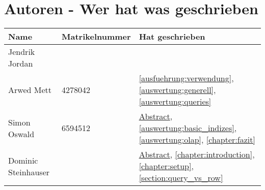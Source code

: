 \chapter{Autoren - Wer hat was geschrieben}
\begin{table}[H]
	\centering
	\begin{tabularx}{\textwidth}{llX}
		\toprule
		Name                &	Matrikelnummer  & Hat geschrieben \\
		\toprule
		Jendrik Jordan      &                   & \\
		Arwed Mett          &   4278042         & \autoref{ausfuehrung:verwendung}, \autoref{auswertung:generell}, \autoref{auswertung:queries} \\
		Simon Oswald        &   6594512         & \hyperref[abstract]{Abstract}, \autoref{auswertung:basic_indizes}, \autoref{auswertung:olap}, \autoref{chapter:fazit} \\
		Dominic Steinhauser &                   & \hyperref[abstract]{Abstract}, \autoref{chapter:introduction}, \autoref{chapter:setup}, \autoref{section:query_vs_row} \\
		\bottomrule
	\end{tabularx}
	\label{tab:autoren}
\end{table}

